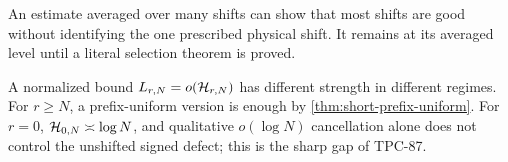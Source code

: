 \begin{remark}
An estimate averaged over many shifts can show that most shifts are
good without identifying the one prescribed physical shift.  It
remains at its averaged level until a literal selection theorem is
proved.
\end{remark}

\begin{remark}
A normalized bound \(L_{r,N}=o(\mathcal H_{r,N})\) has different strength in
different regimes.  For \(r\ge N\), a prefix-uniform version is enough
by \cref{thm:short-prefix-uniform}.  For \(r=0\),
\(\mathcal H_{0,N}\asymp\log N\), and qualitative
\(o(\log N)\) cancellation alone does not control the unshifted
signed defect; this is the sharp gap of TPC-87.
\end{remark}
